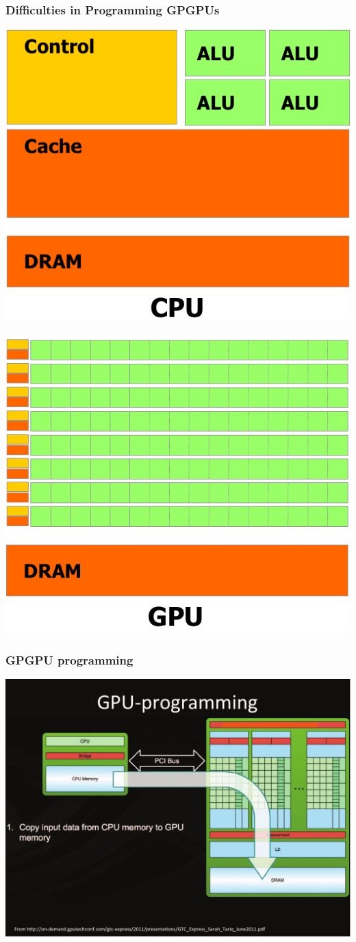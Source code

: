 \documentclass{beamer}
\begin{document}
\begin{frame}[fragile,t]
\frametitle{Difficulties in Programming GPGPUs}

\begin{center}
\includegraphics[height=24ex]{Figures/Lab1/MulticoreArch.png}$\mbox{ }\mbox{ }\mbox{ }$\includegraphics[height=25ex]{Figures/Lab1/GPGPUarch.png}
\end  {center}


\end{frame}



\begin{frame}[fragile,t]
\frametitle{GPGPU programming}

\begin{center}
\includegraphics[height=43ex]{Figures/Lab1/MemCpy1.pdf}
\end  {center}

\end{frame}
\end{document}
